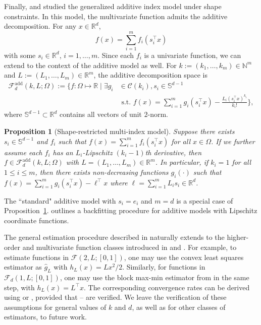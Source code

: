 \documentclass[12pt]{article}
\newtheorem{proposition}[theorem]{Proposition}
\begin{document}
Finally, \cite{mammen2007additive} and \cite{chen2016generalized} studied the generalized additive index model under shape constraints. In this model, the multivariate function admits the additive decomposition. For any $x\in\mathbb{R}^d$, 
\begin{equation*}
f(x)=\sum_{i=1}^m f_i(s_i^{\top} x)
\end{equation*}
with some $ s_i \in \mathbb{R}^d$, $i = 1, \ldots ,m$. Since each $f_i$ is a univariate function, we can extend  to the context of the additive model as well. For $k:=(k_1, \ldots, k_m)\in\mathbb{N}^m$ and $L:=(L_1,\ldots,L_m)\in\mathbb{R}^m$, the additive decomposition space is  
\begin{equation*}
\begin{aligned}
\mathcal{F}_d^{\mathrm{add }}(k, L; \Omega):=\bigg\{f: \Omega \mapsto \mathbb{R}  \mid   \exists g_i &\in \mathcal{C}\left(k_i\right), s_i \in \mathbb{S}^{d-1} \\
& \text{ s.t. } f(x)=\sum_{i=1}^m g_i(s_i^{\top} x)-\frac{L_i(s_i^{\top} x)^{k_i}}{k_{i}!}\bigg\},
\end{aligned}
\end{equation*}
where $\mathbb{S}^{d-1}\subset \mathbb{R}^d$ contains all vectors of unit $2$-norm.

\begin{proposition}[Shape-restricted multi-index model]\label{example:additive-index}
Suppose there exists $s_i \in \mathbb{S}^{d-1}$ and $f_i$ such that $f(x) = \sum_{i=1}^m f_i( s_i^\top x)$ for all $x\in\Omega$. If we further assume each $f_i$ has an $L_i$-Lipschitz $(k_i-1)$th derivative, then $f \in \mathcal{F}^{\textrm{add}}_d(k, L; \Omega)$ with $L = (L_1,\ldots,L_m) \in \mathbb{R}^m$.
In particular, if $k_i = 1$ for all $1\le i\le m$, then there exists non-decreasing functions $g_{i}(\cdot)$ such that $f(x) = \sum_{i=1}^m g_{i}( s_i^{\top}x) - \ell^{\top}x$ where $\ell=\sum_{i=1}^m L_i s_i\in\mathbb{R}^d$.
\end{proposition}
The ``standard" additive model with $s_i = e_i$ and $m=d$ is a special case of Proposition~\ref{example:additive-index}.  outlines a backfitting procedure for additive models with Lipschitz coordinate functions.

The general estimation procedure described in  naturally extends to the higher-order and multivariate function classes introduced in  and . For example, to estimate functions in $\mathcal{F}(2, L; [0,1])$, one may use the convex least squares estimator as $\widehat g_L$ with $h_L(x) = Lx^2/2$. Similarly, for functions in $\mathcal{F}_d(1, L; [0,1])$, one may use the block max-min estimator from \cite{han2020limit} in the same step, with $h_L(x) = L^\top x$. The corresponding convergence rates can be derived using  or , provided that -- are verified. We leave the verification of these assumptions for general values of $k$ and $d$, as well as for other classes of estimators, to future work.
\end{document}
